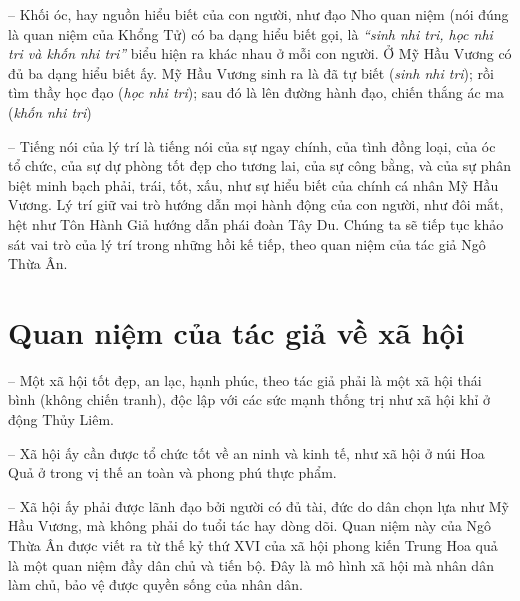 -- Khối óc, hay nguồn hiểu biết của con người, như đạo Nho quan niệm (nói đúng là quan niệm của Khổng Tử) có ba dạng hiểu biết gọi, là \emph{``sinh nhi tri, học nhi tri và khốn nhi tri''} biểu hiện ra khác nhau ở mỗi con người. Ở Mỹ Hầu Vương có đủ ba dạng hiểu biết ấy. Mỹ Hầu Vương sinh ra là đã tự biết (\emph{sinh nhi tri}); rồi tìm thầy học đạo (\emph{học nhi tri}); sau đó là lên đường hành đạo, chiến thắng ác ma (\emph{khốn nhi tri})

-- Tiếng nói của lý trí là tiếng nói của sự ngay chính, của tình đồng loại, của óc tổ chức, của sự dự phòng tốt đẹp cho tương lai, của sự công bằng, và của sự phân biệt minh bạch phải, trái, tốt, xấu, như sự hiểu biết của chính cá nhân Mỹ Hầu Vương. Lý trí giữ vai trò hướng dẫn mọi hành động của con người, như đôi mắt, hệt như Tôn Hành Giả hướng dẫn phái đoàn Tây Du. Chúng ta sẽ tiếp tục khảo sát vai trò của lý trí trong những hồi kế tiếp, theo quan niệm của tác giả Ngô Thừa Ân.


\section{Quan niệm của tác giả về xã hội} %
\label{sec:1_quan_ve_xa_hoi}

-- Một xã hội tốt đẹp, an lạc, hạnh phúc, theo tác giả phải là một xã hội thái bình (không chiến tranh), độc lập với các sức mạnh thống trị như xã hội khỉ ở động Thủy Liêm.

-- Xã hội ấy cần được tổ chức tốt về an ninh và kinh tế, như xã hội ở núi Hoa Quả ở trong vị thế an toàn và phong phú thực phẩm.

-- Xã hội ấy phải được lãnh đạo bởi người có đủ tài, đức do dân chọn lựa như Mỹ Hầu Vương, mà không phải do tuổi tác hay dòng dõi. Quan niệm này của Ngô Thừa Ân được viết ra từ thế kỷ thứ XVI của xã hội phong kiến Trung Hoa quả là một quan niệm đầy dân chủ và tiến bộ. Đây là mô hình xã hội mà nhân dân làm chủ, bảo vệ được quyền sống của nhân dân.
